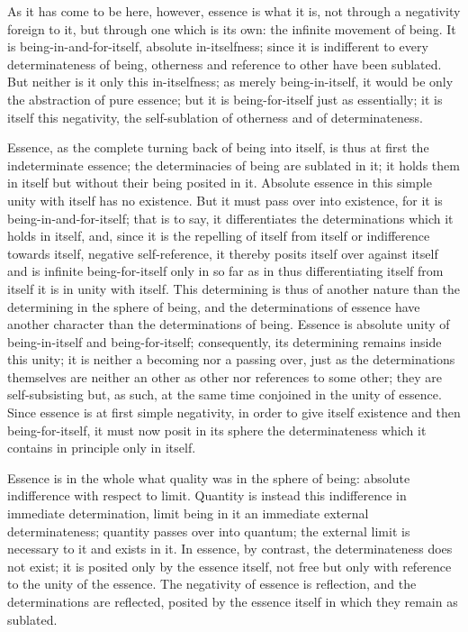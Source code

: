As it has come to be here, however,
essence is what it is,
not through a negativity foreign to it,
but through one which is its own:
the infinite movement of being.
It is being-in-and-for-itself,
absolute in-itselfness;
since it is indifferent to every determinateness of being,
otherness and reference to other have been sublated.
But neither is it only this in-itselfness;
as merely being-in-itself, it would be only the abstraction of pure essence;
but it is being-for-itself just as essentially;
it is itself this negativity,
the self-sublation of otherness and of determinateness.

Essence, as the complete turning back of being into itself,
is thus at first the indeterminate essence;
the determinacies of being are sublated in it;
it holds them in itself but without their being posited in it.
Absolute essence in this simple unity with itself has no existence.
But it must pass over into existence,
for it is being-in-and-for-itself;
that is to say, it differentiates
the determinations which it holds in itself,
and, since it is the repelling of itself from itself
or indifference towards itself, negative self-reference,
it thereby posits itself over against itself
and is infinite being-for-itself
only in so far as in thus
differentiating itself from itself
it is in unity with itself.
This determining is thus of another nature than
the determining in the sphere of being,
and the determinations of essence have another character
than the determinations of being.
Essence is absolute unity of being-in-itself and being-for-itself;
consequently, its determining remains inside this unity;
it is neither a becoming nor a passing over,
just as the determinations themselves are
neither an other as other nor references to some other;
they are self-subsisting but, as such,
at the same time conjoined in the unity of essence.
Since essence is at first simple negativity,
in order to give itself existence and then being-for-itself,
it must now posit in its sphere the determinateness
which it contains in principle only in itself.

Essence is in the whole what quality was in the sphere of being:
absolute indifference with respect to limit.
Quantity is instead this indifference in immediate determination,
limit being in it an immediate external determinateness;
quantity passes over into quantum;
the external limit is necessary to it and exists in it.
In essence, by contrast, the determinateness does not exist;
it is posited only by the essence itself,
not free but only with reference to
the unity of the essence.
The negativity of essence is reflection,
and the determinations are reflected,
posited by the essence itself
in which they remain as sublated.

